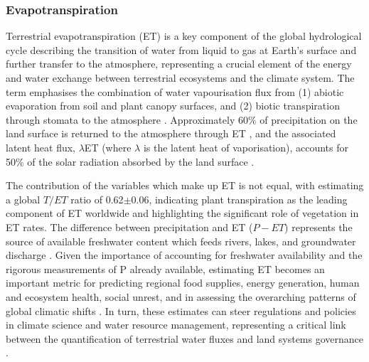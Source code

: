 \documentclass[paper=a4,fontsize=12pt]{scrartcl}
\begin{document}
\subsubsection{Evapotranspiration} 
Terrestrial evapotranspiration (ET) is a key component of the global hydrological cycle describing the transition of water from liquid to gas at Earth's surface and further transfer to the atmosphere, representing a crucial element of the energy and water exchange between terrestrial ecosystems and the climate system. The term emphasises the combination of water vapourisation flux from (1) abiotic evaporation from soil and plant canopy surfaces, and (2) biotic transpiration through stomata to the atmosphere \parencite{katul2012evapotranspiration}. Approximately 60\% of precipitation on the land surface is returned to the atmosphere through ET \parencite{oki2006global}, and the associated latent heat flux, $\lambda$ET (where $\lambda$ is the latent heat of vaporisation), accounts for 50\% of the solar radiation absorbed by the land surface \parencite{trenberth2009earth}.
\par The contribution of the variables which make up ET is not equal, with \textcite{lian2018partitioning} estimating a global $T/ET$ ratio of 0.62$\pm$0.06, indicating plant transpiration as the leading component of ET worldwide and highlighting the significant role of vegetation in ET rates. The difference between precipitation and ET ($P - ET$) represents the source of available freshwater content which feeds rivers, lakes, and groundwater discharge \parencite{swenson2006estimating}. Given the importance of accounting for freshwater availability and the rigorous measurements of P already available, estimating ET becomes an important metric for predicting regional food supplies, energy generation, human and ecosystem health, social unrest, and in assessing the overarching patterns of global climatic shifts \parencite{rodell2018emerging,amani2023review, xue2025review}. In turn, these estimates can steer regulations and policies in climate science and water resource management, representing a critical link between the quantification of terrestrial water fluxes and land systems governance \parencite{shi2024machine}.

\end{document}
